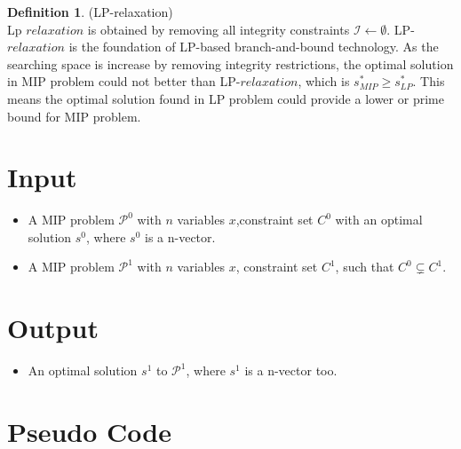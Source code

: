 \documentclass[11pt]{article}
\theoremstyle{definition}
\newtheorem{definition}{Definition}[section] %
\begin{document}
\begin{definition}
(LP-relaxation)\\
Lp $relaxation$ is obtained by removing all integrity constraints $ \mathcal{I} \leftarrow \emptyset$. LP-$relaxation$ is the foundation of LP-based branch-and-bound technology. As the searching space is increase by removing integrity restrictions, the optimal solution in MIP problem could not better than LP-$relaxation$, which is  $s_{MIP}^\ast \geq s_{LP}^\ast $. This means the optimal solution found in LP problem could provide a lower or prime bound for MIP problem.
\label{def_LP}
\end{definition}



\section{Input}
\begin{itemize}
    \item A MIP problem $\mathcal{P}^0$ with $n$ variables $x$,constraint set $C^0$ with an optimal solution $s^0$, where $s^0$ is a n-vector.
    \item A MIP problem $\mathcal{P}^1$ with $n$ variables $x$, constraint set $C^1$, such that $C^0 \subsetneq C^1$.
    
\end{itemize}							

\section{Output}
\begin{itemize}	
    \item An optimal solution $s^1$ to $\mathcal{P}^1$, where $s^1$ is a n-vector too.
\end{itemize}

\section{Pseudo Code}
\end{document}
